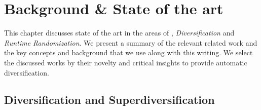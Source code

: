 \chapter{Background \& State of the art}

This chapter discusses state of the art in the areas of \emph{\wasm}, \emph{Diversification} and \emph{Runtime Randomization}. We present a summary of the relevant related work and the key concepts and background that we use along with this writing. 
We select the discussed works by their novelty and critical insights to provide automatic diversification. 




\begin{comment}

\todo{Motivate Wasm here}

\todo{Our area is on wasm, compilers, etc}

\todo{The key related work are in the area of X and Y}

\todo{Wasm is not the context ! Define what the context is : compilers, machine code, portable code, Wasm, interpreters, backend, etc. Use background instead of context. Put everythin that is related to the thesis, concepts. }

\todo{Portable code to be distributed}

\end{comment}




\section{Diversification and Superdiversification}
\label{sota:diversification}


